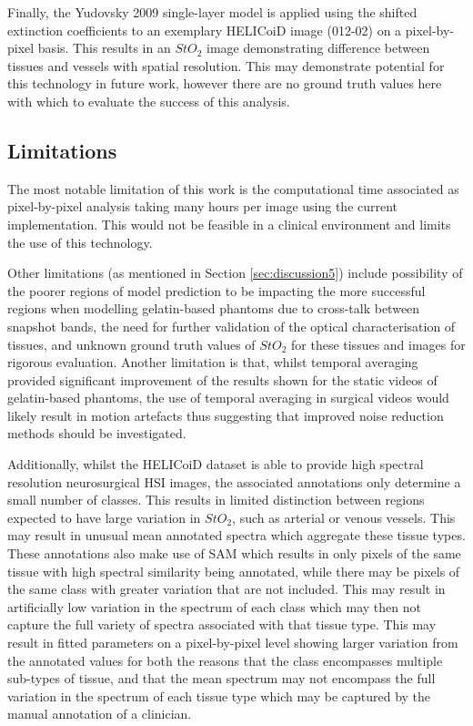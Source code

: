 Finally, the Yudovsky 2009 single-layer model is applied using the shifted extinction coefficients to an exemplary HELICoiD image (012-02) on a pixel-by-pixel basis. This results in an $StO_2$ image demonstrating difference between tissues and vessels with spatial resolution. This may demonstrate potential for this technology in future work, however there are no ground truth values here with which to evaluate the success of this analysis.

\subsection{Limitations}
The most notable limitation of this work is the computational time associated as pixel-by-pixel analysis taking many hours per image using the current implementation. This would not be feasible in a clinical environment and limits the use of this technology. 

Other limitations (as mentioned in Section \ref{sec:discussion5}) include possibility of the poorer regions of model prediction to be impacting the more successful regions when modelling gelatin-based phantoms due to cross-talk between snapshot bands, the need for further validation of the optical characterisation of tissues, and unknown ground truth values of $StO_2$ for these tissues and images for rigorous evaluation. Another limitation is that, whilst temporal averaging provided significant improvement of the results shown for the static videos of gelatin-based phantoms, the use of temporal averaging in surgical videos would likely result in motion artefacts thus suggesting that improved noise reduction methods should be investigated. 

Additionally, whilst the HELICoiD dataset is able to provide high spectral resolution neurosurgical HSI images, the associated annotations only determine a small number of classes. This results in limited distinction between regions expected to have large variation in $StO_2$, such as arterial or venous vessels. This may result in unusual mean annotated spectra which aggregate these tissue types. These annotations also make use of SAM which results in only pixels of the same tissue with high spectral similarity being annotated, while there may be pixels of the same class with greater variation that are not included. This may result in artificially low variation in the spectrum of each class which may then not capture the full variety of spectra associated with that tissue type. This may result in fitted parameters on a pixel-by-pixel level showing larger variation from the annotated values for both the reasons that the class encompasses multiple sub-types of tissue, and that the mean spectrum may not encompass the full variation in the spectrum of each tissue type which may be captured by the manual annotation of a clinician. %


